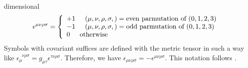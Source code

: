  dimensional
\begin{eqnarray*}
\epsilon^{\mu\nu\rho\sigma}
=
\left\{
\begin{array}{l}
+ 1
\hspace{5mm}
(\mu, \nu, \rho, \sigma, ) = \mbox{even parmutation of } (0, 1, 2, 3)
\\
- 1
\hspace{5mm}
(\mu, \nu, \rho, \sigma, ) = \mbox{odd parmutation of } (0, 1, 2, 3)
\\
0
\hspace{5mm}
\mbox{otherwise}
\end{array}
\right.
\end{eqnarray*}
Symbols with covariant suffices are defined with the metric tensor 
in such a way like $\epsilon_\mu^{\;\;\nu\rho\sigma} = g_{\mu \tau} \epsilon^{\tau \nu\rho\sigma}$.
Therefore, we have $\epsilon_{\mu\nu\rho\sigma} = - \epsilon^{\mu\nu\rho\sigma}$.
This notation follows \cite{ref:Peskin-Schroeder}.

